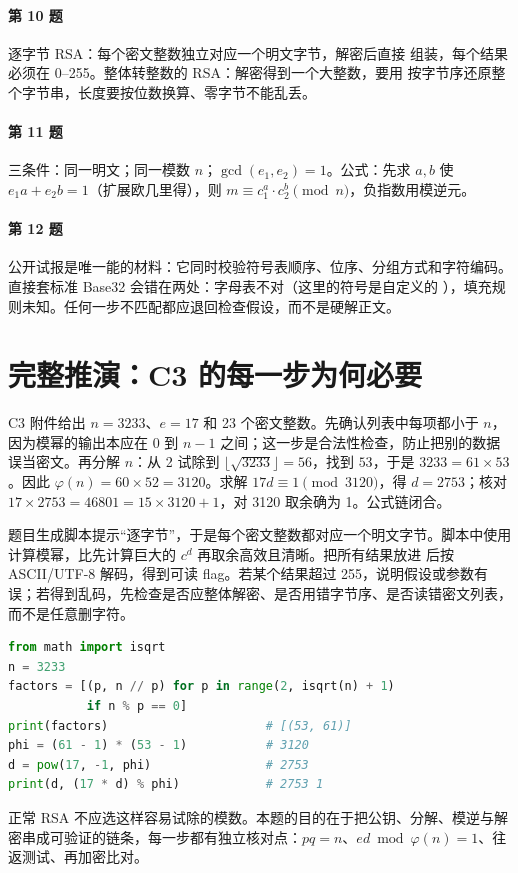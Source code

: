 \documentclass[UTF8,12pt,oneside]{ctexbook}
\begin{document}
\paragraph{第 10 题}逐字节 RSA：每个密文整数独立对应一个明文字节，解密后直接  组装，每个结果必须在 0--255。整体转整数的 RSA：解密得到一个大整数，要用  按字节序还原整个字节串，长度要按位数换算、零字节不能乱丢。

\paragraph{第 11 题}三条件：同一明文；同一模数 $n$；$\gcd(e_1, e_2) = 1$。公式：先求 $a, b$ 使 $e_1 a + e_2 b = 1$（扩展欧几里得），则 $m \equiv c_1^{a} \cdot c_2^{b} \pmod n$，负指数用模逆元。

\paragraph{第 12 题}公开试报是唯一能的材料：它同时校验符号表顺序、位序、分组方式和字符编码。直接套标准 Base32 会错在两处：字母表不对（这里的符号是自定义的 ），填充规则未知。任何一步不匹配都应退回检查假设，而不是硬解正文。

\section{完整推演：C3 的每一步为何必要}
C3 附件给出 $n = 3233$、$e = 17$ 和 23 个密文整数。先确认列表中每项都小于 $n$，因为模幂的输出本应在 $0$ 到 $n-1$ 之间；这一步是合法性检查，防止把别的数据误当密文。再分解 $n$：从 2 试除到 $\lfloor\sqrt{3233}\rfloor = 56$，找到 $53$，于是 $3233 = 61 \times 53$。因此 $\varphi(n) = 60 \times 52 = 3120$。求解 $17d \equiv 1 \pmod{3120}$，得 $d = 2753$；核对 $17 \times 2753 = 46801 = 15 \times 3120 + 1$，对 3120 取余确为 1。公式链闭合。

题目生成脚本提示“逐字节”，于是每个密文整数都对应一个明文字节。脚本中使用  计算模幂，比先计算巨大的 $c^{d}$ 再取余高效且清晰。把所有结果放进  后按 ASCII/UTF-8 解码，得到可读 flag。若某个结果超过 255，说明假设或参数有误；若得到乱码，先检查是否应整体解密、是否用错字节序、是否读错密文列表，而不是任意删字符。
\begin{lstlisting}[language=Python]
from math import isqrt
n = 3233
factors = [(p, n // p) for p in range(2, isqrt(n) + 1)
           if n % p == 0]
print(factors)                      # [(53, 61)]
phi = (61 - 1) * (53 - 1)           # 3120
d = pow(17, -1, phi)                # 2753
print(d, (17 * d) % phi)            # 2753 1
\end{lstlisting}
正常 RSA 不应选这样容易试除的模数。本题的目的在于把公钥、分解、模逆与解密串成可验证的链条，每一步都有独立核对点：$pq = n$、$ed \bmod \varphi(n) = 1$、往返测试、再加密比对。
\end{document}
